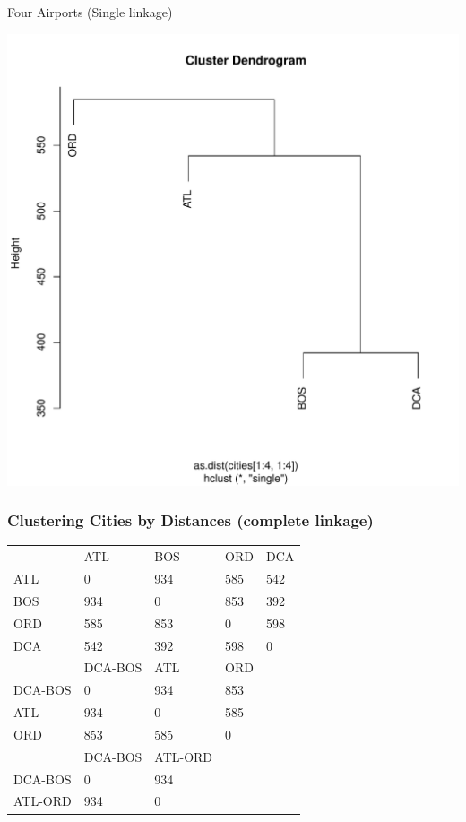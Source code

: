 \documentclass[xcolor=x11names,compress]{beamer}\usepackage[]{graphicx}\usepackage[]{color}
\newenvironment{knitrout}{}{} %
\begin{document}
\begin{frame}[fragile]{Four Airports (Single linkage)}
\begin{knitrout}\tiny
{}\color{fgcolor}

{\centering \includegraphics[width=.6\linewidth]{figure/beamer-apsing-1} 

}



\end{knitrout}
\end{frame}








\begin{frame}
  \frametitle{Clustering Cities by Distances (complete linkage)}
  \begin{table}[!htbp]
    \centering
   \begin{tabular}{lllll}
   & ATL&BOS&ORD& DCA\\
ATL&  0 &934&585&542\\
BOS& 934&  0&853& 392\\
ORD& 585&853&  0& 598\\
DCA& 542&392& 598&   0
\\ \hline
       &DCA-BOS&ATL&ORD\\
DCA-BOS&0      &934&853   \\
ATL    &934    &0  &585\\
ORD    &853       &585&0
\\ \hline
          &DCA-BOS&ATL-ORD\\
DCA-BOS&0          &934   \\
ATL-ORD&934       &0
\end{tabular}
\end{table}
\end{frame}
\end{document}

